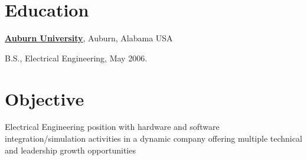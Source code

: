 \documentclass[8pt]{article}
\newenvironment{outerlist}[1][\enskip\textbullet]%
       {\begin{compactenum}[#1]}{\end{compactenum}%
        \vspace{-.3\baselineskip}}
\newenvironment{innerlist}[1][\enskip\textbullet]%
       {\begin{compactenum}[#1]}{\end{compactenum}}
\newcommand{\blankline}{\quad\pagebreak[2]}
\begin{document}
\section{\textbf{Education}}
%
\href{http://www.auburn.edu/}{\textbf{Auburn University}},
Auburn, Alabama USA
\begin{outerlist}
\item B.S., Electrical Engineering, May 2006.


\end{outerlist}
\blankline

\section{\textbf{Objective}}
{\small Electrical Engineering position with hardware and software integration/simulation
activities in a dynamic company offering  multiple technical and leadership growth opportunities
}
\blankline
\end{document}
